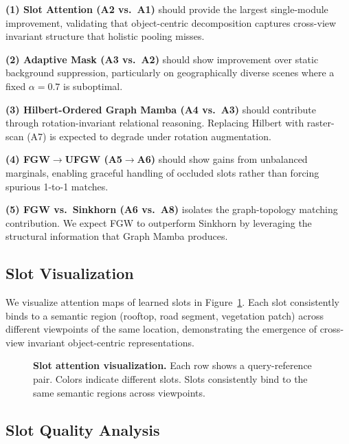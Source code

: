 \documentclass{article}
\begin{document}
\textbf{(1) Slot Attention (A2 vs.\ A1)} should provide the largest single-module improvement, validating that object-centric decomposition captures cross-view invariant structure that holistic pooling misses.

\textbf{(2) Adaptive Mask (A3 vs.\ A2)} should show improvement over static background suppression, particularly on geographically diverse scenes where a fixed $\alpha{=}0.7$ is suboptimal.

\textbf{(3) Hilbert-Ordered Graph Mamba (A4 vs.\ A3)} should contribute through rotation-invariant relational reasoning. Replacing Hilbert with raster-scan (A7) is expected to degrade under rotation augmentation.

\textbf{(4) FGW$\to$UFGW (A5$\to$A6)} should show gains from unbalanced marginals, enabling graceful handling of occluded slots rather than forcing spurious 1-to-1 matches.

\textbf{(5) FGW vs.\ Sinkhorn (A6 vs.\ A8)} isolates the graph-topology matching contribution. We expect FGW to outperform Sinkhorn by leveraging the structural information that Graph Mamba produces.

\subsection{Slot Visualization}

We visualize attention maps of learned slots in Figure~\ref{fig:slots}. Each slot consistently binds to a semantic region (rooftop, road segment, vegetation patch) across different viewpoints of the same location, demonstrating the emergence of cross-view invariant object-centric representations.

\begin{figure}[h]
    \centering
    \caption{\textbf{Slot attention visualization.} Each row shows a query-reference pair. Colors indicate different slots. Slots consistently bind to the same semantic regions across viewpoints.}
    \label{fig:slots}
\end{figure}

\subsection{Slot Quality Analysis}
\end{document}
